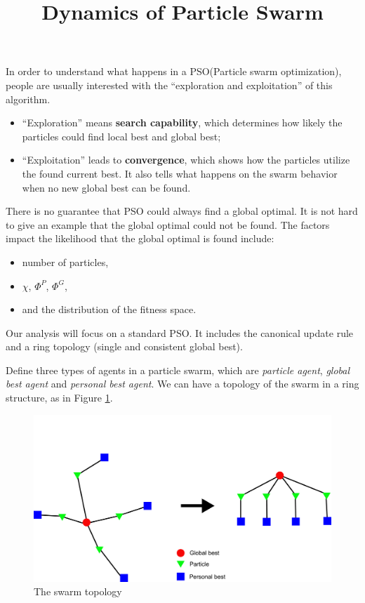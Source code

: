 \documentclass[10pt,a4paper]{article}
\begin{document}
\title{Dynamics of Particle Swarm}

\date{}

\maketitle

In order to understand what happens in a PSO(Particle swarm optimization), people are usually interested with the ``exploration and exploitation'' of this algorithm.
\begin{itemize}
\item ``Exploration'' means \textbf{search capability}, which determines how likely the particles could find local best and global best;
\item ``Exploitation'' leads to \textbf{convergence}, which shows how the particles utilize the found current best.
It also tells what happens on the swarm behavior when no new global best can be found.
\end{itemize}

There is no guarantee that PSO could always find a global optimal.
It is not hard to give an example that the global optimal could not be found. 
The factors impact the likelihood that the global optimal is found include:
\begin{itemize}
\item number of particles,
\item $ \chi $, $ \Phi^{P} $, $ \Phi^{G} $,
\item and the distribution of the fitness space.
\end{itemize}

Our analysis will focus on a standard PSO.
It includes the canonical update rule and a ring topology (single and consistent global best).

Define three types of agents in a particle swarm, which are \emph{particle agent}, \emph{global best agent} and \emph{personal best agent}.
We can have a topology of the swarm in a ring structure, as in Figure \ref{fig:topology3}.

\begin{figure}
\centering
\includegraphics[width=0.7\linewidth]{./topology3}
\caption{The swarm topology}
\label{fig:topology3}
\end{figure}
\end{document}
